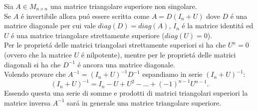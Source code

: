 Sia $A \in M_{n \times n}$ una matrice triangolare superiore non singolare.\\
Se $A$ \'e invertibile allora pu\'o essere scritta come $A=D(\mathit{I_n}+U)$ dove $D$ \'e una matrice diagonale per cui vale $diag(D)=diag(A)$, $\mathit{I_n}$ \'e la matrice identit\'a ed $U$ \'e una matrice triangolare strettamente superiore ($diag(U)=0$).\\
Per le propriet\'a delle matrici triangolari strettamente superiori si ha che $U^n = 0$ (ovvero che la matrice $U$ \'e nilpotente), mentre per le propriet\'a delle matrici diagonali si ha che $D^{-1}$ \'e ancora una matrice diagonale.
\\
Volendo provare che $A^{-1}=(\mathit{I_n}+U)^{-1}D^{-1}$ espandiamo in serie $ (\mathit{I_n}+U)^{-1}$:
\[
(\mathit{I_n}+U)^{-1}=\mathit{I_n}-U+U^2-...+(-1)^{n-1}U^{n-1}.
\]
Essendo questa una serie di somme e prodotti di matrici triangolari superiori la matrice inversa $A^{-1}$ sar\'a in generale una matrice triangolare superiore.


